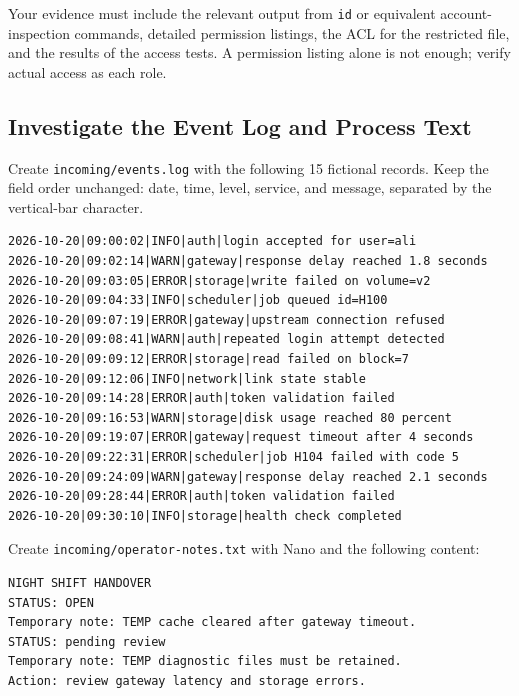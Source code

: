 Your evidence must include the relevant output from \texttt{id} or equivalent account-inspection commands, detailed permission listings, the ACL for the restricted file, and the results of the access tests. A permission listing alone is not enough; verify actual access as each role.

\subsection{Investigate the Event Log and Process Text}

Create \texttt{incoming/events.log} with the following 15 fictional records. Keep the field order unchanged: date, time, level, service, and message, separated by the vertical-bar character.

\begin{lstlisting}[language=Terminal]
2026-10-20|09:00:02|INFO|auth|login accepted for user=ali
2026-10-20|09:02:14|WARN|gateway|response delay reached 1.8 seconds
2026-10-20|09:03:05|ERROR|storage|write failed on volume=v2
2026-10-20|09:04:33|INFO|scheduler|job queued id=H100
2026-10-20|09:07:19|ERROR|gateway|upstream connection refused
2026-10-20|09:08:41|WARN|auth|repeated login attempt detected
2026-10-20|09:09:12|ERROR|storage|read failed on block=7
2026-10-20|09:12:06|INFO|network|link state stable
2026-10-20|09:14:28|ERROR|auth|token validation failed
2026-10-20|09:16:53|WARN|storage|disk usage reached 80 percent
2026-10-20|09:19:07|ERROR|gateway|request timeout after 4 seconds
2026-10-20|09:22:31|ERROR|scheduler|job H104 failed with code 5
2026-10-20|09:24:09|WARN|gateway|response delay reached 2.1 seconds
2026-10-20|09:28:44|ERROR|auth|token validation failed
2026-10-20|09:30:10|INFO|storage|health check completed
\end{lstlisting}

Create \texttt{incoming/operator-notes.txt} with Nano and the following content:

\begin{lstlisting}[language=Terminal]
NIGHT SHIFT HANDOVER
STATUS: OPEN
Temporary note: TEMP cache cleared after gateway timeout.
STATUS: pending review
Temporary note: TEMP diagnostic files must be retained.
Action: review gateway latency and storage errors.
\end{lstlisting}

